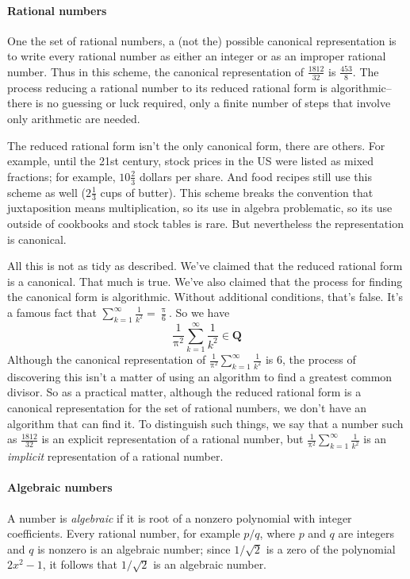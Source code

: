 \documentclass[12pt,fleqn]{article}
\newcommand{\rationals}{\mathbf{Q}}
\begin{document}
\paragraph{Rational numbers} One the set of rational numbers, a (not the) possible canonical representation  is to write every rational number as either an integer or as an improper
rational number.  Thus in this scheme, the canonical representation of $\frac{1812}{32}$ is  $\frac{453}{8}$. The process reducing a rational
number to its reduced rational  form is algorithmic--there is no guessing or luck required, only a finite number of steps that  involve only arithmetic are needed.

The reduced rational form isn't the only canonical form, there are others. For example, until the 21st century, stock prices in the US were listed as mixed fractions; for example, $10 \frac{2}{3}$ dollars per share. And food recipes still use this scheme as well ($2 \frac{1}{3}$ cups of butter). This scheme 
breaks the  convention that juxtaposition means multiplication, so its use in algebra problematic, so its use outside of cookbooks and stock tables is rare. But
nevertheless the representation is canonical.

All this is not as tidy as described. We've claimed that the reduced rational form is a canonical. That much is true. We've also claimed that the 
process for finding the canonical form is algorithmic. Without additional conditions, that's false.  It's a famous fact that 
$\sum_{k=1}^\infty \frac{1}{k^2}  = \frac{\uppi}{6}$. So we have
\begin{equation}
\frac{1}{\uppi^2} \sum_{k=1}^\infty \frac{1}{k^2}  \in \rationals
\end{equation}
Although the canonical representation of $\frac{1}{\uppi^2} \sum_{k=1}^\infty \frac{1}{k^2}  $ is 6, the process of discovering this isn't a matter of 
using an algorithm to find a greatest common divisor.  So as a practical matter, although the reduced rational form is a canonical representation for the
set of rational numbers, we don't have an algorithm that can find it.  To distinguish such things, we say that a number such as $\frac{1812}{32}$  is
an explicit representation of a rational number, but $\frac{1}{\uppi^2} \sum_{k=1}^\infty \frac{1}{k^2}  $ is an \emph{implicit} representation of
a rational number.

\paragraph{Algebraic  numbers} A number is \emph{algebraic} if it is root of a nonzero polynomial with integer coefficients. Every rational number, for example 
$p/q$, where $p$ and $q$ are integers and $q$ is nonzero is an algebraic number; since $1/\sqrt{2}$ is a zero of the polynomial $2 x^2 - 1$, it
follows that $1/\sqrt{2}$ is an algebraic number. 
\end{document}
